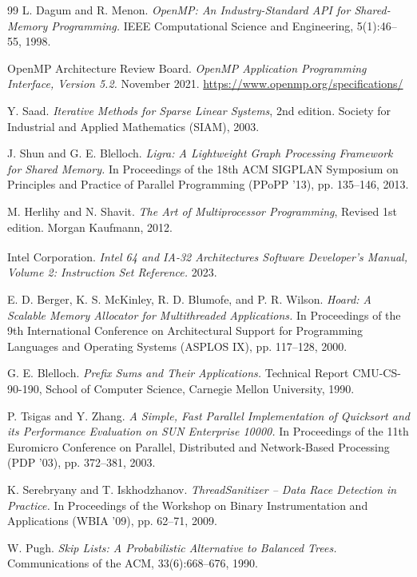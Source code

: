 \begin{thebibliography}{99}
L. Dagum and R. Menon.
\textit{OpenMP: An Industry-Standard API for Shared-Memory Programming.}
IEEE Computational Science and Engineering, 5(1):46--55, 1998.

OpenMP Architecture Review Board.
\textit{OpenMP Application Programming Interface, Version 5.2.}
November 2021. \url{https://www.openmp.org/specifications/}

Y. Saad.
\textit{Iterative Methods for Sparse Linear Systems}, 2nd edition.
Society for Industrial and Applied Mathematics (SIAM), 2003.

J. Shun and G. E. Blelloch.
\textit{Ligra: A Lightweight Graph Processing Framework for Shared Memory.}
In Proceedings of the 18th ACM SIGPLAN Symposium on Principles and Practice of Parallel Programming (PPoPP '13), pp. 135--146, 2013.

M. Herlihy and N. Shavit.
\textit{The Art of Multiprocessor Programming}, Revised 1st edition.
Morgan Kaufmann, 2012.

Intel Corporation.
\textit{Intel\textsuperscript{\textregistered} 64 and IA-32 Architectures Software Developer's Manual, Volume 2: Instruction Set Reference.}
2023.

E. D. Berger, K. S. McKinley, R. D. Blumofe, and P. R. Wilson.
\textit{Hoard: A Scalable Memory Allocator for Multithreaded Applications.}
In Proceedings of the 9th International Conference on Architectural Support for Programming Languages and Operating Systems (ASPLOS IX), pp. 117--128, 2000.

G. E. Blelloch.
\textit{Prefix Sums and Their Applications.}
Technical Report CMU-CS-90-190, School of Computer Science, Carnegie Mellon University, 1990.

P. Tsigas and Y. Zhang.
\textit{A Simple, Fast Parallel Implementation of Quicksort and its Performance Evaluation on SUN Enterprise 10000.}
In Proceedings of the 11th Euromicro Conference on Parallel, Distributed and Network-Based Processing (PDP '03), pp. 372--381, 2003.

K. Serebryany and T. Iskhodzhanov.
\textit{ThreadSanitizer -- Data Race Detection in Practice.}
In Proceedings of the Workshop on Binary Instrumentation and Applications (WBIA '09), pp. 62--71, 2009.

W. Pugh.
\textit{Skip Lists: A Probabilistic Alternative to Balanced Trees.}
Communications of the ACM, 33(6):668--676, 1990.


\end{thebibliography}
